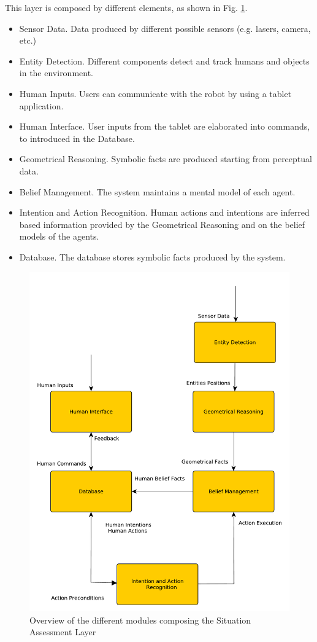 This layer is composed by different elements, as shown in Fig. \ref{fig:situation_assessment-situation_assessment_overview}.
\begin{itemize}
\item Sensor Data. Data produced by different possible sensors (e.g. lasers, camera, etc.)
\item Entity Detection. Different components detect and track humans and objects in the environment.
\item Human Inputs. Users can communicate with the robot by using a tablet application.
\item Human Interface. User inputs from the tablet are elaborated into commands, to introduced in the Database.
\item Geometrical Reasoning. Symbolic facts are produced starting from perceptual data.
\item Belief Management. The system maintains a mental model of each agent.
\item Intention and Action Recognition. Human actions and intentions are inferred based information provided by the Geometrical Reasoning and on the belief models of the agents.
\item Database. The database stores symbolic facts produced by the system.
\end{itemize}


 \begin{figure}[h!]
	\centering
	\includegraphics[scale=0.45]{img/situation_assessment/situation_assessment_overview}
	\caption{Overview of the different modules composing the Situation Assessment Layer}
	\label{fig:situation_assessment-situation_assessment_overview}
\end{figure}

